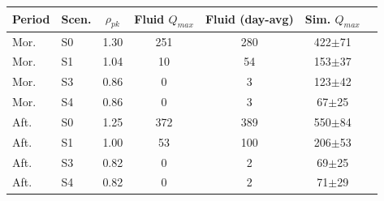 \begin{tabular}{@{}llccccc@{}}\toprule
Period & Scen. & $\rho_{pk}$ & Fluid $Q_{max}$ & Fluid (day-avg) & Sim. $Q_{max}$ \\ \midrule
Mor. & S0 & 1.30 & 251 & 280 & 422$\pm$71 \\
Mor. & S1 & 1.04 & 10 & 54 & 153$\pm$37 \\
Mor. & S3 & 0.86 & 0 & 3 & 123$\pm$42 \\
Mor. & S4 & 0.86 & 0 & 3 & 67$\pm$25 \\
Aft. & S0 & 1.25 & 372 & 389 & 550$\pm$84 \\
Aft. & S1 & 1.00 & 53 & 100 & 206$\pm$53 \\
Aft. & S3 & 0.82 & 0 & 2 & 69$\pm$25 \\
Aft. & S4 & 0.82 & 0 & 2 & 71$\pm$29 \\
\bottomrule\end{tabular}
